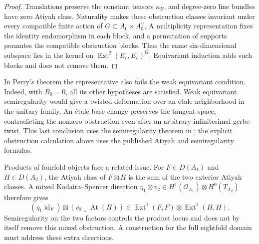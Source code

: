 \begin{proof}
Translations preserve the constant tensors $\kappa_B$, and degree-zero line bundles have zero Atiyah class. Naturality makes these obstruction classes invariant under every compatible finite action of $G\subset A_0\times A_0^\vee$. A multiplicity representation fixes the identity endomorphism in each block, and a permutation of supports permutes the compatible obstruction blocks. Thus the same six-dimensional subspace lies in the kernel on $\operatorname{Ext}^2(E_v,E_v)^G$. Equivariant induction adds such blocks and does not remove them.
\end{proof}

In Perry's theorem the representative also fails the weak equivariant condition. Indeed, with $B_0=0$, all its other hypotheses are satisfied. Weak equivariant semiregularity would give a twisted deformation over an \'etale neighborhood in the unitary family. An \'etale base change preserves the tangent space, contradicting the nonzero obstruction even after an arbitrary infinitesimal gerbe twist. This last conclusion uses the semiregularity theorem in \cite{Perry}; the explicit obstruction calculation above uses the published Atiyah and semiregularity formulas.

Products of fourfold objects face a related issue. For $F\in D(A_1)$ and $H\in D(A_2)$, the Atiyah class of $F\boxtimes H$ is the sum of the two exterior Atiyah classes. A mixed Kodaira--Spencer direction $\eta_1\otimes v_2\in H^1(\mathcal O_{A_1})\otimes H^0(T_{A_2})$ therefore gives
\[
 (\eta_1\operatorname{id}_F)\boxtimes
 (v_2\mathbin{\lrcorner}\operatorname{At}(H))
 \in\operatorname{Ext}^1(F,F)\otimes\operatorname{Ext}^1(H,H).
\]
Semiregularity on the two factors controls the product locus and does not by itself remove this mixed obstruction. A construction for the full eightfold domain must address these extra directions.
